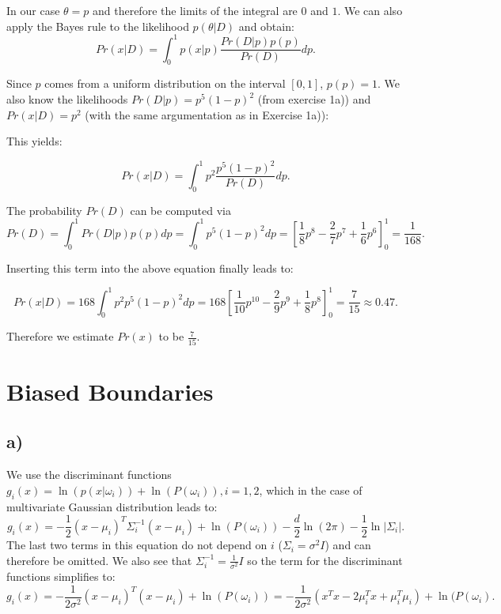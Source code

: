 \documentclass[paper=a4,fontsize=10pt,DIV11,BCOR10mm]{scrartcl}
\begin{document}
In our case $\theta=p$ and therefore the limits of the integral are $0$ and $1$. We can also apply the Bayes rule to the likelihood $p(\theta|D)$ and obtain:
\begin{equation*}
Pr(x|D)=\int _0^1 p(x|p) \frac{Pr(D|p)p(p)}{Pr(D)} dp  \text{.}
\end{equation*}

Since $p$ comes from a uniform distribution on the interval $[0,1]$, $p(p)=1$. We also know the likelihoods $Pr(D|p)=p^5(1-p)^2$ (from exercise 1a)) and $Pr(x|D)=p^2$ (with the same argumentation as in Exercise 1a)):

This yields:

\begin{equation*}
Pr(x|D)=\int _0^1 p^2 \frac{p^5(1-p)^2}{Pr(D)} dp  \text{.}
\end{equation*}

The probability $Pr(D)$ can be computed via 
\begin{equation*}
Pr(D)=\int_0^1 Pr(D|p) p(p)dp =\int_0^1 p^5(1-p)^2 dp= \left[ \frac{1}{8} p^8 - \frac{2}{7} p^7 +\frac{1}{6} p^6\right]_0^1 =\frac{1}{168}\text{.}
\end{equation*}

Inserting this term into the above equation finally leads to:

\begin{equation*}
Pr(x|D)=168 \int _0^1 p^2 p^5(1-p)^2 dp  =168 \left [  \frac{1}{10}p^{10} - \frac{2}{9}p^9 + \frac{1}{8}p^8 \right]_0^1= \frac{7}{15}\approx 0.47\text{.}
\end{equation*}

Therefore we estimate $Pr(x)$ to be $\frac{7}{15}$.

\section{Biased Boundaries}
\subsection*{a)}
We use the discriminant functions $g_i(x)=\ln (p(x|\omega_i))+\ln(P(\omega_i)), i=1,2$, which in the case of multivariate Gaussian distribution leads to:
\begin{equation*}
g_i(x)= -\frac{1}{2}(x-\mu_i)^T\Sigma_i^{-1}(x-\mu_i)+ \ln(P(\omega_i)) -\frac{d}{2} \ln(2 \pi)-\frac{1}{2}\ln \lvert\Sigma_i\rvert\text{.}
\end{equation*}
The last two terms in this equation do not depend on $i$ ($\Sigma_i=\sigma^2I$) and can therefore be omitted. We also see that $\Sigma_i ^{-1}=\frac{1}{\sigma^2}I$ so the term for the discriminant functions simplifies to:
\begin{equation*}
g_i(x)= -\frac{1}{2 \sigma^2}(x-\mu_i)^T(x-\mu_i)+ \ln(P(\omega_i))=-\frac{1}{2 \sigma^2}(x^Tx-2\mu_i^T x +\mu_i^T \mu_i)+ \ln(P(\omega_i)\text{.}
\end{equation*}
\end{document}
